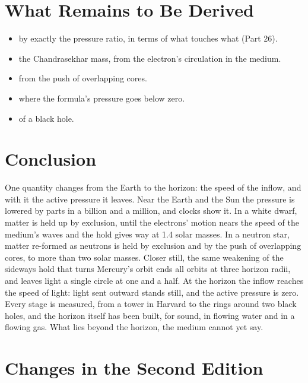 \section{What Remains to Be Derived}

\begin{itemize}
\item {} by exactly the pressure ratio, in terms of what touches what (Part 26).
\item {} the Chandrasekhar mass, from the electron's circulation in the medium.
\item {} from the push of overlapping cores.
\item {} where the formula's pressure goes below zero.
\item {} of a black hole.
\end{itemize}

\section*{Conclusion}

One quantity changes from the Earth to the horizon: the speed of the inflow, and with it the active pressure it leaves. Near the Earth and the Sun the pressure is lowered by parts in a billion and a million, and clocks show it. In a white dwarf, matter is held up by exclusion, until the electrons' motion nears the speed of the medium's waves and the hold gives way at 1.4 solar masses. In a neutron star, matter re-formed as neutrons is held by exclusion and by the push of overlapping cores, to more than two solar masses. Closer still, the same weakening of the sideways hold that turns Mercury's orbit ends all orbits at three horizon radii, and leaves light a single circle at one and a half. At the horizon the inflow reaches the speed of light: light sent outward stands still, and the active pressure is zero. Every stage is measured, from a tower in Harvard to the rings around two black holes, and the horizon itself has been built, for sound, in flowing water and in a flowing gas. What lies beyond the horizon, the medium cannot yet say.

\clearpage
\section*{Changes in the Second Edition}

